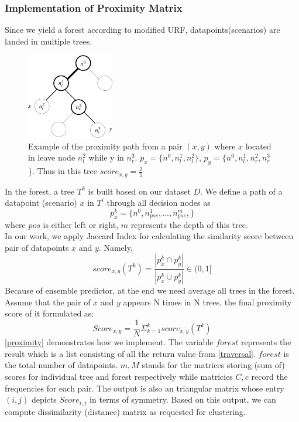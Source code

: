 \documentclass[conference]{IEEEtran}
\begin{document}
\subsubsection{Implementation of Proximity Matrix }\label{proximitysection}
Since we yield a forest according to modified URF, datapoints(scenarios) are landed in multiple trees.
\\
\begin{figure}[!t]
  \centering
  \includegraphics[width=1.5in]{./images/path}
  \caption{Example of the proximity path from a pair $(x,y)$ where $x$ located in leave node $n^2_{l}$ while y in $n^3_{r}$. $p_{x}=\{n^0, n^1_{l}, n^2_{l}\}$, $p_{y}=\{n^0, n^1_{l}, n^2_{r}, n^3_{r}$\}. 
  Thus in this tree $score_{x,y}=\frac{2}{5}$ }
  \label{fig_sim}
  \end{figure}
In the forest, a tree $T^k$ is built based on our dataset $D$. We define a path of a datapoint (scenario) $x$ in $T^i$ through all decision nodes as 
$$p^k_{x}=\{n^0, n^1_{pos},...,n^m_{pos},\}$$ where $pos$ is either left or right, $m$ represents the depth of this tree.\\
In our work, we apply Jaccard Index for calculating the similarity score between pair of datapoints $x$ and $y$. Namely,
$$score_{x,y}(T^k) = \frac{|p^k_{x} \cap p^k_{y}|}{|p^k_{x} \cup p^k_{y}|} \in (0,1]$$
Because of ensemble predictor, at the end we need average all trees in the forest. 
Assume that the pair of $x$ and $y$ appears N times in N trees, the final proximity score of it formulated as:
$$Score_{x,y} = \frac{1}{N} \Sigma_{k=1}^k score_{x,y}(T^k) $$
\autoref{proximity} demonstrates how we implement. The variable $forest$ represents the result which is a list consisting of all the return value from \autoref{traversal}. 
$forest$ is the total number of datapoints.
$m,M$ stands for the matrices storing (sum of) scores for individual tree and forest respectively while matricies $C,c$ record the frequencies for each pair. 
The output is also an triangular matrix whose entry $(i,j)$ depicts $Score_{i,j}$ in terms of symmetry. 
Based on this output, we can compute dissimilarity (distance) matrix as requested for clustering.
\end{document}
